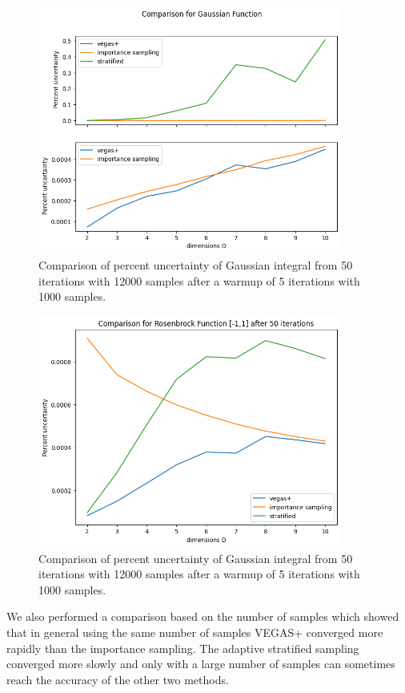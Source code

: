 \documentclass[../main/main.tex]{subfiles}
\begin{document}
\begin{figure}[h]
	\centering
	\includegraphics[width=10cm]{../../../tests/plots/gauss_dims_2.png}
	\caption{Comparison of  percent uncertainty of Gaussian integral  from 50 iterations with 12000 samples after a warmup of 5 iterations with 1000 samples. }
	\label{gauss_dim}
\end{figure}

\begin{figure}[h]
	\centering
	\includegraphics[width=10cm]{../../../tests/plots/rosen_dims_final.png}
	\caption{Comparison of  percent uncertainty of Gaussian integral  from 50 iterations with 12000 samples after a warmup of 5 iterations with 1000 samples. }
	\label{rosen_dims}
\end{figure}


We also performed a comparison based on the number of samples which showed that in general using the same number of samples VEGAS+
converged more rapidly than the importance sampling. The adaptive stratified sampling converged more slowly and only with a large number of samples can sometimes reach the accuracy of the other two methods.
\end{document}

